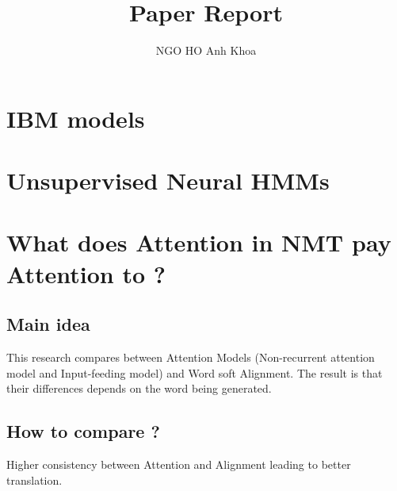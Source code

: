\documentclass{article}
\title{Paper Report} %
\author{NGO HO Anh Khoa} %
\begin{document}
\maketitle %




\section{IBM models}
\section{Unsupervised Neural HMMs \citep{Tran16unsupervised}}
\section{What does Attention in NMT pay Attention to ? \citep{Ghader2017what} }
\subsection{Main idea}
This research compares between Attention Models (Non-recurrent attention model and Input-feeding model) and Word soft Alignment.
The result is that their differences depends on the word being generated.
\subsection{How to compare ?}
Higher consistency between Attention and Alignment leading to better translation.






\end{document}
